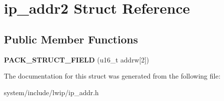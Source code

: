 \hypertarget{structip__addr2}{}\section{ip\+\_\+addr2 Struct Reference}
\label{structip__addr2}
\subsection*{Public Member Functions}
\begin{DoxyCompactItemize}
\item 
\hypertarget{structip__addr2_a098e42efa61e0c431ab501098426767d}{}{\bfseries P\+A\+C\+K\+\_\+\+S\+T\+R\+U\+C\+T\+\_\+\+F\+I\+E\+L\+D} (u16\+\_\+t addrw\mbox{[}2\mbox{]})\label{structip__addr2_a098e42efa61e0c431ab501098426767d}

\end{DoxyCompactItemize}


The documentation for this struct was generated from the following file\+:\begin{DoxyCompactItemize}
\item 
system/include/lwip/ip\+\_\+addr.\+h\end{DoxyCompactItemize}
